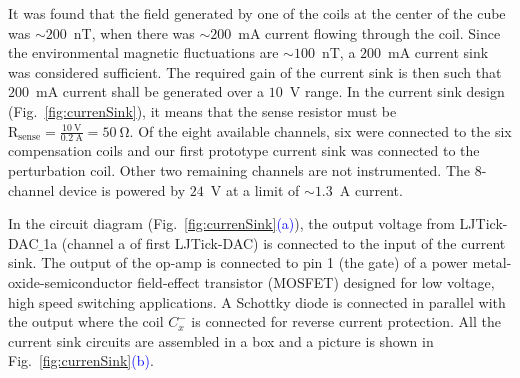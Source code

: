 It was found that the field generated by one of the coils at the center of the cube was $\sim200$~nT, when there was $\sim200$~mA current flowing through the coil. Since the environmental magnetic fluctuations are $\sim100$~nT, a $200$~mA current sink was considered sufficient. The required gain of the current sink is then such that $200$~mA current shall be generated over a $10$~V range. In the current sink design (Fig.~\ref{fig:currenSink}), it means that the sense resistor must be $\mathrm{R_{sense}=\frac{10~V}{0.2~A}=50~\Omega}$. Of the eight available channels, six were connected to the six compensation coils and our first prototype current sink was connected to the perturbation coil. Other two remaining channels are not instrumented. The 8-channel device is powered by $24$~V at a limit of $\sim 1.3$~A current. 





In the circuit diagram (Fig.~\ref{fig:currenSink}\textcolor{blue}{(a)}), the output voltage from LJTick-DAC$\_$1a (channel a of first LJTick-DAC) is connected to the input of the current sink. The output of the op-amp is connected to pin 1 (the gate) of a power metal-oxide-semiconductor field-effect transistor (MOSFET) designed for low voltage, high speed switching applications. A Schottky diode is connected in parallel with the output where the coil $C_x^-$ is connected for reverse current protection. All the current sink circuits are assembled in a box and a picture is shown in Fig.~\ref{fig:currenSink}\textcolor{blue}{(b)}.

